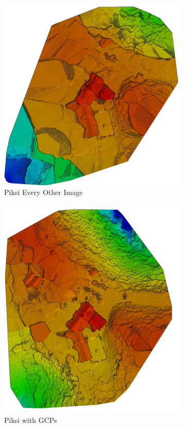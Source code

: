 \documentclass{article}
\begin{document}
\begin{figure}
\begin{subfigure}{.33\textwidth}
  \centering
  \includegraphics[width=.72\linewidth]{images/DSM/p_every_other_image.png}
  \caption{Piksi Every Other Image}
  \label{fig:sub1}
\end{subfigure}%
\begin{subfigure}{.33\textwidth}
  \centering
  \includegraphics[width=.72\linewidth]{images/DSM/p_gcp.png}
  \caption{Piksi with GCPs}
  \label{fig:sub1}
\end{subfigure}%
\begin{subfigure}{.33\textwidth}
  \centering

\end{subfigure}
\end{figure}
\end{document}
